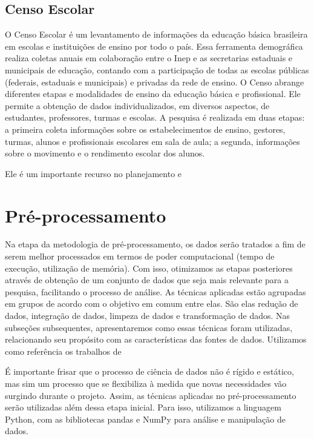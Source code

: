 \subsection{Censo Escolar}
O Censo Escolar é um levantamento de informações da educação básica brasileira em escolas e instituições de ensino por todo o país. Essa ferramenta demográfica realiza coletas anuais em colaboração entre o Inep e as secretarias estaduais e municipais de educação, contando com a participação de todas as escolas públicas (federais, estaduais e municipais) e privadas da rede de ensino. O Censo abrange diferentes etapas e modalidades de ensino da educação básica e profissional. Ele permite a obtenção de dados individualizados, em diversos aspectos, de estudantes, professores, turmas e escolas. A pesquisa é realizada em duas etapas: a primeira coleta informações sobre os estabelecimentos de ensino, gestores, turmas, alunos e profissionais escolares em sala de aula; a segunda, informações sobre o movimento e o rendimento escolar dos alunos. 

Ele é um importante recurso no planejamento e 


\section{Pré-processamento}
Na etapa da metodologia de pré-processamento, os dados serão tratados a fim de serem melhor processados em termos de poder computacional (tempo de execução, utilização de memória). Com isso, otimizamos as etapas posteriores através de obtenção de um conjunto de dados que seja mais relevante para a pesquisa, facilitando o processo de análise. As técnicas aplicadas estão agrupadas em grupos de acordo com o objetivo em comum entre elas. São elas redução de dados, integração de dados, limpeza de dados e transformação de dados. Nas subseções subsequentes, apresentaremos como essas técnicas foram utilizadas, relacionando seu propósito com as características das fontes de dados. Utilizamos como referência os trabalhos de 

É importante frisar que o processo de ciência de dados não é rígido e estático, mas sim um processo que se flexibiliza à medida que novas necessidades vão surgindo durante o projeto. Assim, as técnicas aplicadas no pré-processamento serão utilizadas além dessa etapa inicial. Para isso, utilizamos a linguagem Python, com as bibliotecas pandas e NumPy para análise e manipulação de dados.

